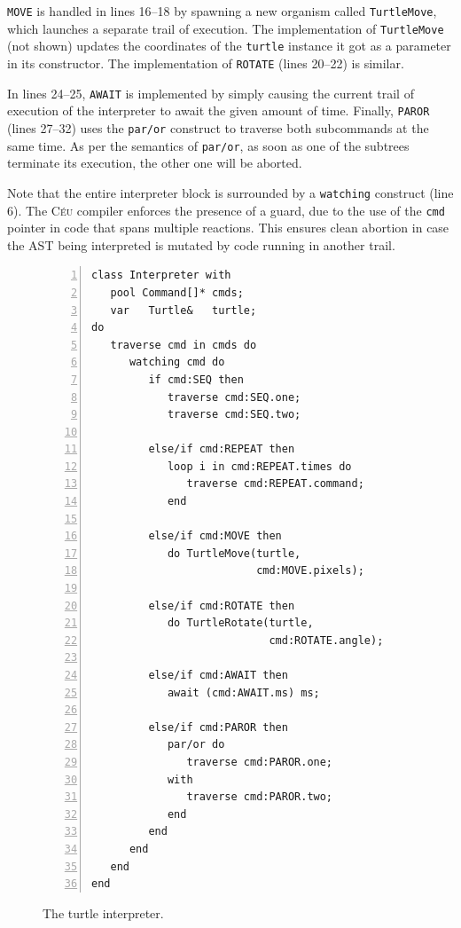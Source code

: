 \documentclass{sig-alternate}
\newcommand{\CEU}{\textsc{C\'{e}u}\xspace}
\newcommand{\code}[1] {{\small{\texttt{#1}}}}
\begin{document}
\code{MOVE} is handled in lines 16--18 by spawning a new organism called
\code{TurtleMove}, which launches a separate trail of execution. The
implementation of \code{TurtleMove} (not shown) updates the coordinates of the
\code{turtle} instance it got as a parameter in its constructor. The
implementation of \code{ROTATE} (lines 20--22) is similar.

In lines 24--25, \code{AWAIT} is implemented by simply causing the current
trail of execution of the interpreter to await the given amount of time.
Finally, \code{PAROR} (lines 27--32) uses the \code{par/or} construct
to traverse both subcommands at the same time. As per the semantics of
\code{par/or}, as soon as one of the subtrees terminate its execution,
the other one will be aborted.

Note that the entire interpreter block is surrounded by a \code{watching}
construct (line 6). The \CEU compiler enforces the presence of a guard, 
due to the use of the \code{cmd} pointer in code that spans multiple
reactions. This ensures clean abortion in case the AST being interpreted
is mutated by code running in another trail.

\begin{figure}%
\begin{lstlisting}[numbers=left,xleftmargin=3em]
class Interpreter with
   pool Command[]* cmds;
   var   Turtle&   turtle;
do
   traverse cmd in cmds do
      watching cmd do
         if cmd:SEQ then
            traverse cmd:SEQ.one;
            traverse cmd:SEQ.two;

         else/if cmd:REPEAT then
            loop i in cmd:REPEAT.times do
               traverse cmd:REPEAT.command;
            end

         else/if cmd:MOVE then
            do TurtleMove(turtle,
                          cmd:MOVE.pixels);

         else/if cmd:ROTATE then
            do TurtleRotate(turtle,
                            cmd:ROTATE.angle);

         else/if cmd:AWAIT then
            await (cmd:AWAIT.ms) ms;

         else/if cmd:PAROR then
            par/or do
               traverse cmd:PAROR.one;
            with
               traverse cmd:PAROR.two;
            end
         end
      end
   end
end
\end{lstlisting}
\caption{ The turtle interpreter.
\label{lst.turtle.interpreter}
}
\end{figure}
\end{document}
